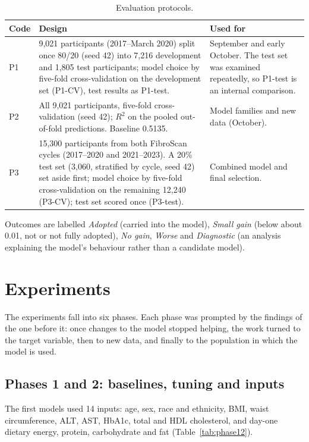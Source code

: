 \begin{table}[t]
\centering
\small
\caption{Evaluation protocols.}
\label{tab:protocols}
\begin{tabularx}{\textwidth}{@{}l Y Y@{}}
\toprule
Code & Design & Used for \\
\midrule
P1 & 9,021 participants (2017--March 2020) split once 80/20 (seed 42) into 7,216 development and 1,805 test participants; model choice by five-fold cross-validation on the development set (P1-CV), test results as P1-test. & September and early October. The test set was examined repeatedly, so P1-test is an internal comparison. \\
P2 & All 9,021 participants, five-fold cross-validation (seed 42); $R^2$ on the pooled out-of-fold predictions. Baseline 0.5135. & Model families and new data (October). \\
P3 & 15,300 participants from both FibroScan cycles (2017--2020 and 2021--2023). A 20\% test set (3,060, stratified by cycle, seed 42) set aside first; model choice by five-fold cross-validation on the remaining 12,240 (P3-CV); test set scored once (P3-test). & Combined model and final selection. \\
\bottomrule
\end{tabularx}
\end{table}

Outcomes are labelled \emph{Adopted} (carried into the model), \emph{Small gain} (below about 0.01, not or not fully adopted), \emph{No gain}, \emph{Worse} and \emph{Diagnostic} (an analysis explaining the model's behaviour rather than a candidate model).

\section{Experiments}
\label{sec:exp-list}

The experiments fall into six phases. Each phase was prompted by the findings of the one before it: once changes to the model stopped helping, the work turned to the target variable, then to new data, and finally to the population in which the model is used.

\subsection{Phases 1 and 2: baselines, tuning and inputs}

The first models used 14 inputs: age, sex, race and ethnicity, BMI, waist circumference, ALT, AST, HbA1c, total and HDL cholesterol, and day-one dietary energy, protein, carbohydrate and fat (Table~\ref{tab:phase12}).

